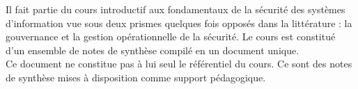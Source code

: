 

Il fait partie du cours introductif aux fondamentaux de la sécurité des systèmes d'information vue sous deux prismes quelques fois opposés dans la littérature : la gouvernance et la gestion opérationnelle de la sécurité.
Le cours est constitué d'un ensemble de notes de synthèse compilé en un document unique.\\
Ce document ne constitue pas à lui seul le référentiel du cours. Ce sont des notes de synthèse mises à disposition comme support pédagogique.